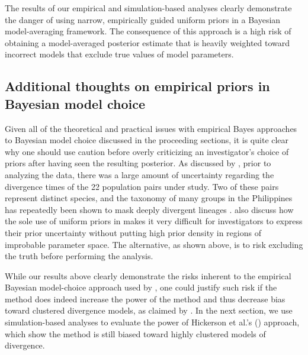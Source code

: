 \documentclass[letterpaper,12pt]{article}
\begin{document}
\begin{linenumbers}
The results of our empirical and simulation-based analyses clearly demonstrate
the danger of using narrow, empirically guided uniform priors in a Bayesian
model-averaging framework.
The consequence of this approach is a high risk of obtaining a model-averaged
posterior estimate that is heavily weighted toward incorrect models that
exclude true values of model parameters.


\subsection*{Additional thoughts on empirical priors in Bayesian model choice}
Given all of the theoretical and practical issues with empirical Bayes
approaches to Bayesian model choice discussed in the proceeding sections, it is
quite clear why one should use caution before overly criticizing an
investigator's choice of priors after having seen the resulting posterior.
As discussed by \citet{Oaks2012}, prior to analyzing the data, there was a large
amount of uncertainty regarding the divergence times of the 22 population pairs
under study.
Two of these pairs represent distinct species, and the taxonomy of many groups
in the Philippines has repeatedly been shown to mask deeply divergent lineages
\citep{RafeDiesmosAlcala2008,Linkem2010,Siler2010,Welton2010,Siler2011HerpMonographs,
    Siler2011,Siler2012,RafeStuart2012,LinkemBrown2013}.
\citet{Oaks2012} also discuss how the sole use of uniform priors in \msb makes
it very difficult for investigators to express their prior uncertainty without
putting high prior density in regions of improbable parameter space.
The alternative, as shown above, is to risk excluding the truth before
performing the analysis.

While our results above clearly demonstrate the risks inherent to the empirical
Bayesian model-choice approach used by \citet{Hickerson2013}, one could justify
such risk if the method does indeed increase the power of the method and thus
decrease bias toward clustered divergence models, as claimed by
\citet{Hickerson2013}.
In the next section, we use simulation-based analyses to evaluate the power of
Hickerson et al.'s (\citeyear{Hickerson2013}) approach, which show the method is
still biased toward highly clustered models of divergence.






\end{linenumbers}
\end{document}

